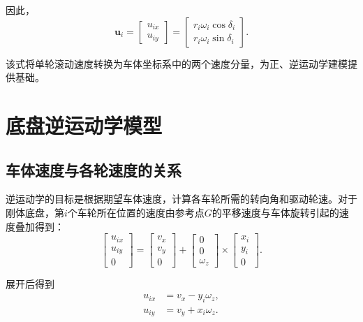 \documentclass[UTF8,12pt,a4paper,openany]{ctexbook}
\begin{document}
因此，
\begin{equation}
    \boldsymbol{u}_i
    =
    \begin{bmatrix}
        u_{ix}\\
        u_{iy}
    \end{bmatrix}
    =
    \begin{bmatrix}
        r_i\omega_i\cos\delta_i\\
        r_i\omega_i\sin\delta_i
    \end{bmatrix}.
    \label{eq:kc-wheel-components}
\end{equation}

该式将单轮滚动速度转换为车体坐标系中的两个速度分量，为正、逆运动学建模提供基础。

\section{底盘逆运动学模型}

\subsection{车体速度与各轮速度的关系}

逆运动学的目标是根据期望车体速度，计算各车轮所需的转向角和驱动轮速。对于刚体底盘，第$i$个车轮所在位置的速度由参考点$G$的平移速度与车体旋转引起的速度叠加得到：
\begin{equation}
    \begin{bmatrix}
        u_{ix}\\
        u_{iy}\\
        0
    \end{bmatrix}
    =
    \begin{bmatrix}
        v_x\\
        v_y\\
        0
    \end{bmatrix}
    +
    \begin{bmatrix}
        0\\
        0\\
        \omega_z
    \end{bmatrix}
    \times
    \begin{bmatrix}
        x_i\\
        y_i\\
        0
    \end{bmatrix}.
\end{equation}

展开后得到
\begin{equation}
\begin{aligned}
    u_{ix}&=v_x-y_i\omega_z,\\
    u_{iy}&=v_y+x_i\omega_z.
\end{aligned}
\label{eq:kc-rigid-velocity}
\end{equation}
\end{document}

